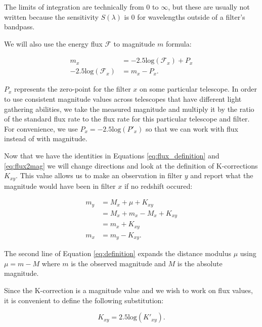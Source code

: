 \documentclass[linenumbers]{aastex631}
\begin{document}
The limits of integration are technically from 0 to $\infty$, but these are
usually not written because the sensitivity $S(\lambda)$ is 0 for wavelengths
outside of a filter's bandpass.

We will also use the energy flux $\mathcal{F}$ to magnitude $m$ formula:

\begin{equation}
\begin{aligned}
\label{eq:flux2mag}
                             m_x &= -2.5 \text{log}(\mathcal{F}_x) + P_x \\
  -2.5 \text{log}(\mathcal{F}_x) &= m_x - P_x .
\end{aligned}
\end{equation}

$P_x$ represents the zero-point for the filter $x$ on some particular
telescope. In order to use consistent magnitude values across telescopes that
have different light gathering abilities, we take the measured magnitude and
multiply it by the ratio of the standard flux rate to the flux rate for this
particular telescope and filter. For convenience, we use $P_x = -2.5
\text{log}(P'_x)$ so that we can work with flux instead of with magnitude.

Now that we have the identities in Equations \ref{eq:flux_definition} and
\ref{eq:flux2mag} we will change directions and look at the definition of
K-corrections $K_{xy}$. This value allows us to make an observation in filter
$y$ and report what the magnitude would have been in filter $x$ if no redshift
occured:

\begin{equation}
\begin{aligned}
\label{eq:definition}
  m_y &= M_x + \mu + K_{xy} \\
      &= M_x + m_x - M_x + K_{xy} \\
      &= m_x + K_{xy} \\
  m_x &= m_y - K_{xy} .
\end{aligned}
\end{equation}

The second line of Equation \ref{eq:definition} expands the distance modulus
$\mu$ using $\mu = m - M$ where $m$ is the observed magnitude and $M$ is the
absolute magnitude.

Since the K-correction is a magnitude value and we wish to work on flux values,
it is convenient to define the following substitution:

\begin{equation}
\label{eq:k_substitution}
  K_{xy} = 2.5\text{log}(K'_{xy}) .
\end{equation}
\end{document}
